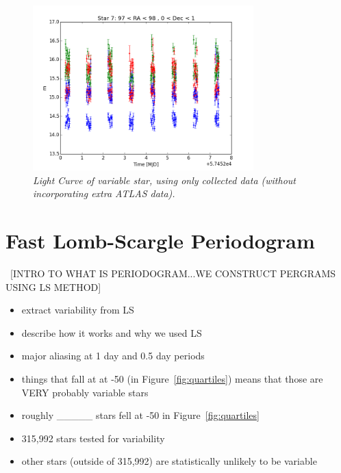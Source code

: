 \documentclass[aps,prl,twocolumn,superscriptaddress]{revtex4-1}
\begin{document}
\begin{figure}[H]
 \centering
 	\includegraphics[width=3.35in]{figures/LC/star7_97_98_0_1_restricted.png}
 \caption{\it \small{Light Curve of variable star, using only collected data (without incorporating extra ATLAS data).}}
 \label{fig:restrictedLC7}
\end{figure}



\section{Fast Lomb-Scargle Periodogram}

~[INTRO TO WHAT IS PERIODOGRAM...WE CONSTRUCT PERGRAMS USING LS METHOD]
\begin{itemize}
	\item{} extract variability from LS
	\item{} describe how it works and why we used LS
	\item{} major aliasing at 1 day and 0.5 day periods
	\item{} things that fall at at -50 (in Figure~\ref{fig:quartiles}) means that those are VERY probably variable stars
	\item{} roughly \_\_\_\_\_ stars fell at -50 in Figure~\ref{fig:quartiles}
	\item{} 315,992 stars tested for variability
	\item{} other stars (outside of 315,992) are statistically unlikely to be variable
\end{itemize}
\end{document}
